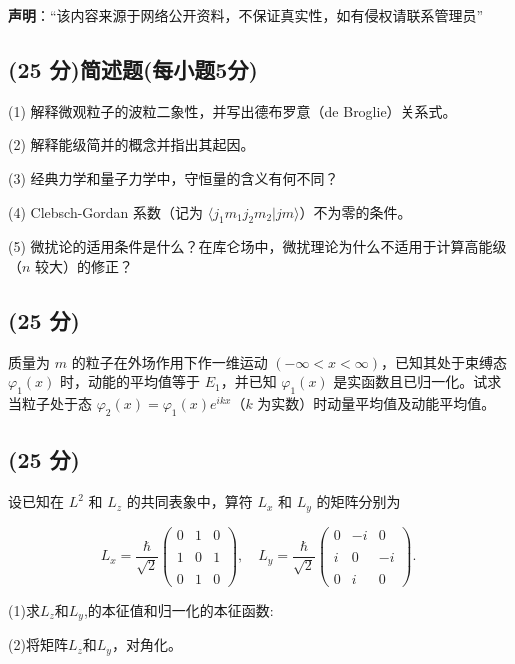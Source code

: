 
\textbf{声明}：“该内容来源于网络公开资料，不保证真实性，如有侵权请联系管理员”

\subsection{(25 分)简述题(每小题5分)}
(1) 解释微观粒子的波粒二象性，并写出德布罗意（de Broglie）关系式。

(2) 解释能级简并的概念并指出其起因。

(3) 经典力学和量子力学中，守恒量的含义有何不同？

(4) Clebsch-Gordan 系数（记为 $\langle  j_1 m_1 j_2 m_2|j m  \rangle$）不为零的条件。

(5) 微扰论的适用条件是什么？在库仑场中，微扰理论为什么不适用于计算高能级（$n$ 较大）的修正？

\subsection{(25 分)}
质量为 \( m \) 的粒子在外场作用下作一维运动 \((- \infty < x < \infty)\)，已知其处于束缚态 \(\varphi_1(x)\) 时，动能的平均值等于 \( E_1 \)，并已知 \(\varphi_1(x)\) 是实函数且已归一化。试求当粒子处于态 \(\varphi_2(x) = \varphi_1(x) e^{ikx}\)（\(k\) 为实数）时动量平均值及动能平均值。
\subsection{(25 分)}
设已知在 \( L^2 \) 和 \( L_z \) 的共同表象中，算符 \( L_x \) 和 \( L_y \) 的矩阵分别为

$$L_x = \frac{\hbar}{\sqrt{2}}\begin{pmatrix}0 & 1 & 0 \\\\1 & 0 & 1 \\\\0 & 1 & 0\end{pmatrix}, \quad L_y = \frac{\hbar}{\sqrt{2}}\begin{pmatrix}0 & -i & 0 \\\\i & 0 & -i \\\\0 & i & 0\end{pmatrix}.~$$

(1)求\( L_z \)和\( L_y \),的本征值和归一化的本征函数:

(2)将矩阵\( L_z \)和\( L_y \)，对角化。
